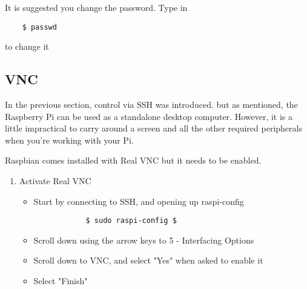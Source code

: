 It is suggested you change the password. Type in 
\begin{verbatim}
    $ passwd
\end{verbatim}
to change it

\subsection{VNC}
In the previous section, control via SSH was introduced. but as mentioned, the Raspberry Pi can be used as a standalone desktop computer. However, it is a little impractical to carry around a screen and all the other required peripherals when you're working with your Pi. 

Raspbian comes installed with Real VNC but it needs to be enabled.

\begin{enumerate}
    \item Activate Real VNC\\
        \begin{itemize}
            \item Start by connecting to SSH, and opening up raspi-config
        \begin{verbatim}
            $ sudo raspi-config $
        \end{verbatim}
        \item Scroll down using the arrow keys to 5 - Interfacing Options
        \item Scroll down to VNC, and select "Yes" when asked to enable it
        \item Select "Finish"
    \end{itemize}
    

\end{enumerate}
